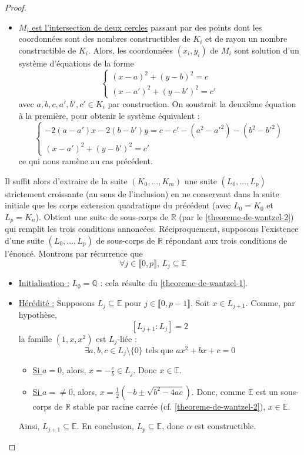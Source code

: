 \begin{proof}
\begin{itemize}
\begin{itemize}
      \end{itemize}
      \item \uline{$M_i$ est l'intersection de deux cercles} passant par des points dont les coordonnées sont des nombres constructibles de $K_i$ et de rayon un nombre constructible de $K_i$. Alors, les coordonnées $(x_i, y_i)$ de $M_i$ sont solution d'un système d'équations de la forme
      \[
      \begin{cases}
        (x-a)^2 + (y-b)^2 = c \\
        (x-a')^2 + (y-b')^2 = c'
      \end{cases}
      \]
      avec $a, b, c, a', b', c' \in K_i$ par construction. On soustrait la deuxième équation à la première, pour obtenir le système équivalent :
      \[
        \begin{cases}
          -2(a-a')x -2(b-b')y = c-c' - (a^2-a'^2) - (b^2-b'^2) \\
          (x-a')^2 + (y-b')^2 = c'
        \end{cases}
      \]
      ce qui nous ramène au cas précédent.
    \end{itemize}
    Il suffit alors d'extraire de la suite $(K_0, \dots, K_m)$ une suite $(L_0, \dots, L_p)$ strictement croissante (au sens de l'inclusion) en ne conservant dans la suite initiale que les corps extension quadratique du précédent (avec $L_0 = K_0$ et $L_p = K_n$). Obtient une suite de sous-corps de $\mathbb{R}$ (par le \cref{theoreme-de-wantzel-2}) qui remplit les trois conditions annoncées.
    \newpar
    Réciproquement, supposons l'existence d'une suite $(L_0, \dots, L_p)$ de sous-corps de $\mathbb{R}$ répondant aux trois conditions de l'énoncé. Montrons par récurrence que
    \[ \forall j \in \llbracket 0, p \rrbracket, \, L_j \subseteq \mathbb{E} \]
    \begin{itemize}
      \item \uline{Initialisation :} $L_0 = \mathbb{Q}$ : cela résulte du \cref{theoreme-de-wantzel-1}.
      \item \uline{Hérédité :} Supposons $L_j \subseteq \mathbb{E}$ pour $j \in \llbracket 0, p-1 \rrbracket$. Soit $x \in L_{j+1}$. Comme, par hypothèse,
      \[ [L_{j+1}:L_j] = 2 \]
      la famille $(1,x,x^2)$ est $L_j$-liée :
      \[ \exists a, b, c \in L_j \setminus \{ 0 \} \text{ tels que } ax^2 + bx + c = 0 \]
      \begin{itemize}
        \item \uline{Si $a = 0$}, alors, $x = -\frac{c}{b} \in L_j$. Donc $x \in \mathbb{E}$.
        \item \uline{Si $a =\neq 0$}, alors, $x = \frac{1}{2}(-b \pm \sqrt{b^2 - 4ac})$. Donc, comme $\mathbb{E}$ est un sous-corps de $\mathbb{R}$ stable par racine carrée (cf. \cref{theoreme-de-wantzel-2}), $x \in \mathbb{E}$.
      \end{itemize}
      Ainsi, $L_{j+1} \subseteq \mathbb{E}$. En conclusion, $L_p \subseteq \mathbb{E}$, donc $\alpha$ est constructible.
    \end{itemize}
  \end{proof}


